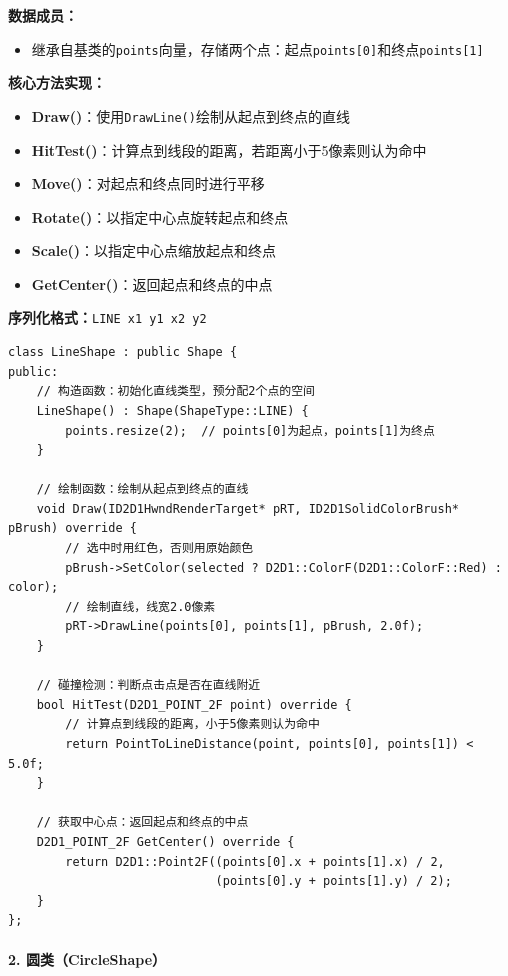 \documentclass[12pt,a4paper]{article}
\begin{document}
\begin{tcolorbox}
\textbf{数据成员：}
\begin{itemize}
    \item 继承自基类的\texttt{points}向量，存储两个点：起点\texttt{points[0]}和终点\texttt{points[1]}
\end{itemize}

\textbf{核心方法实现：}
\begin{itemize}
    \item \textbf{Draw()}：使用\texttt{DrawLine()}绘制从起点到终点的直线
    \item \textbf{HitTest()}：计算点到线段的距离，若距离小于5像素则认为命中
    \item \textbf{Move()}：对起点和终点同时进行平移
    \item \textbf{Rotate()}：以指定中心点旋转起点和终点
    \item \textbf{Scale()}：以指定中心点缩放起点和终点
    \item \textbf{GetCenter()}：返回起点和终点的中点
\end{itemize}

\textbf{序列化格式：}\texttt{LINE x1 y1 x2 y2}
\end{tcolorbox}

\begin{lstlisting}[caption=LineShape类定义]
class LineShape : public Shape {
public:
    // 构造函数：初始化直线类型，预分配2个点的空间
    LineShape() : Shape(ShapeType::LINE) {
        points.resize(2);  // points[0]为起点，points[1]为终点
    }
    
    // 绘制函数：绘制从起点到终点的直线
    void Draw(ID2D1HwndRenderTarget* pRT, ID2D1SolidColorBrush* pBrush) override {
        // 选中时用红色，否则用原始颜色
        pBrush->SetColor(selected ? D2D1::ColorF(D2D1::ColorF::Red) : color);
        // 绘制直线，线宽2.0像素
        pRT->DrawLine(points[0], points[1], pBrush, 2.0f);
    }
    
    // 碰撞检测：判断点击点是否在直线附近
    bool HitTest(D2D1_POINT_2F point) override {
        // 计算点到线段的距离，小于5像素则认为命中
        return PointToLineDistance(point, points[0], points[1]) < 5.0f;
    }
    
    // 获取中心点：返回起点和终点的中点
    D2D1_POINT_2F GetCenter() override {
        return D2D1::Point2F((points[0].x + points[1].x) / 2,
                             (points[0].y + points[1].y) / 2);
    }
};
\end{lstlisting}

\paragraph{2. 圆类（CircleShape）}
\end{document}
